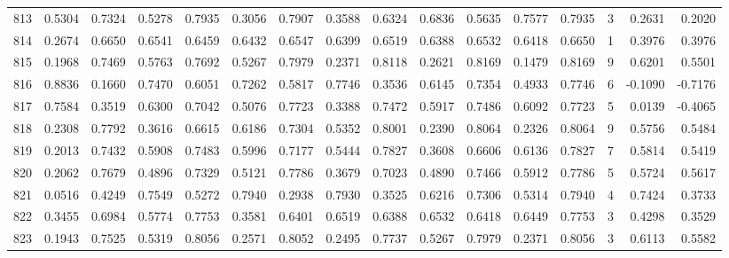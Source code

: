 \begin{tabular}{lrrrrrrrrrrrrrrr}
813 &      0.5304 &  0.7324 &  0.5278 &  0.7935 &  0.3056 &  0.7907 &  0.3588 &  0.6324 &  0.6836 &  0.5635 &   0.7577 &     0.7935 &      3 &                    0.2631 &                     0.2020 \\
814 &      0.2674 &  0.6650 &  0.6541 &  0.6459 &  0.6432 &  0.6547 &  0.6399 &  0.6519 &  0.6388 &  0.6532 &   0.6418 &     0.6650 &      1 &                    0.3976 &                     0.3976 \\
815 &      0.1968 &  0.7469 &  0.5763 &  0.7692 &  0.5267 &  0.7979 &  0.2371 &  0.8118 &  0.2621 &  0.8169 &   0.1479 &     0.8169 &      9 &                    0.6201 &                     0.5501 \\
816 &      0.8836 &  0.1660 &  0.7470 &  0.6051 &  0.7262 &  0.5817 &  0.7746 &  0.3536 &  0.6145 &  0.7354 &   0.4933 &     0.7746 &      6 &                   -0.1090 &                    -0.7176 \\
817 &      0.7584 &  0.3519 &  0.6300 &  0.7042 &  0.5076 &  0.7723 &  0.3388 &  0.7472 &  0.5917 &  0.7486 &   0.6092 &     0.7723 &      5 &                    0.0139 &                    -0.4065 \\
818 &      0.2308 &  0.7792 &  0.3616 &  0.6615 &  0.6186 &  0.7304 &  0.5352 &  0.8001 &  0.2390 &  0.8064 &   0.2326 &     0.8064 &      9 &                    0.5756 &                     0.5484 \\
819 &      0.2013 &  0.7432 &  0.5908 &  0.7483 &  0.5996 &  0.7177 &  0.5444 &  0.7827 &  0.3608 &  0.6606 &   0.6136 &     0.7827 &      7 &                    0.5814 &                     0.5419 \\
820 &      0.2062 &  0.7679 &  0.4896 &  0.7329 &  0.5121 &  0.7786 &  0.3679 &  0.7023 &  0.4890 &  0.7466 &   0.5912 &     0.7786 &      5 &                    0.5724 &                     0.5617 \\
821 &      0.0516 &  0.4249 &  0.7549 &  0.5272 &  0.7940 &  0.2938 &  0.7930 &  0.3525 &  0.6216 &  0.7306 &   0.5314 &     0.7940 &      4 &                    0.7424 &                     0.3733 \\
822 &      0.3455 &  0.6984 &  0.5774 &  0.7753 &  0.3581 &  0.6401 &  0.6519 &  0.6388 &  0.6532 &  0.6418 &   0.6449 &     0.7753 &      3 &                    0.4298 &                     0.3529 \\
823 &      0.1943 &  0.7525 &  0.5319 &  0.8056 &  0.2571 &  0.8052 &  0.2495 &  0.7737 &  0.5267 &  0.7979 &   0.2371 &     0.8056 &      3 &                    0.6113 &                     0.5582 \\

\end{tabular}
